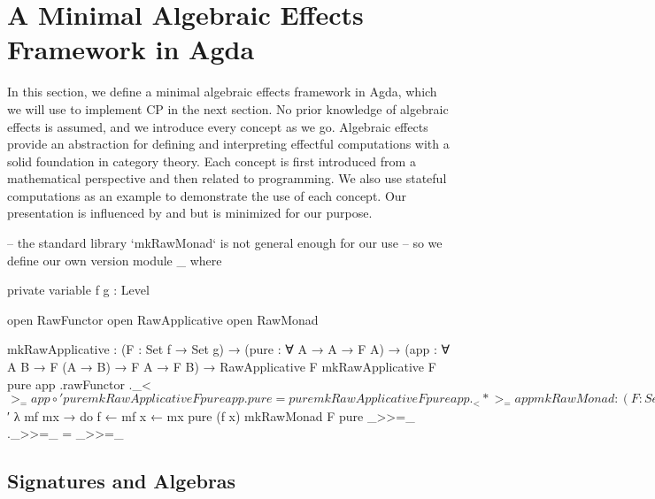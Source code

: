 \section{A Minimal Algebraic Effects Framework in Agda}

In this section, we define a minimal algebraic effects framework in Agda, which we will use to implement CP in the next section.
%
No prior knowledge of algebraic effects is assumed, and we introduce every concept as we go.
%
Algebraic effects provide an abstraction for defining and interpreting effectful computations with a solid foundation in category theory.
%
Each concept is first introduced from a mathematical perspective and then related to programming.
%
We also use stateful computations as an example to demonstrate the use of each concept.
%
Our presentation is influenced by \citet{bauer-2019} and \citet{kidney-2023} but is minimized for our purpose.


\begin{code}[hide]
-- the standard library `mkRawMonad` is not general enough for our use
-- so we define our own version
module _ where

  private
    variable
      f g : Level

  open RawFunctor
  open RawApplicative
  open RawMonad

  mkRawApplicative :
    (F : Set f → Set g) →
    (pure : ∀ {A} → A → F A) →
    (app : ∀ {A B} → F (A → B) → F A → F B) →
    RawApplicative F
  mkRawApplicative F pure app .rawFunctor ._<$>_ = app ∘′ pure
  mkRawApplicative F pure app .pure = pure
  mkRawApplicative F pure app ._<*>_ = app

  mkRawMonad :
    (F : Set f → Set g) →
    (pure : ∀ {A} → A → F A) →
    (bind : ∀ {A B} → F A → (A → F B) → F B) →
    RawMonad F
  mkRawMonad F pure _>>=_ .rawApplicative =
    mkRawApplicative _ pure $′ λ mf mx → do
      f ← mf
      x ← mx
      pure (f x)
  mkRawMonad F pure _>>=_ ._>>=_ = _>>=_
\end{code}

\subsection{Signatures and Algebras}

